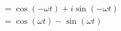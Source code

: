 \documentclass[preview]{standalone}
\begin{document}
\begin{align*}
=\cos{(-\omega t)}+i\sin{(-\omega t)} \\ = \cos{(\omega t)}-\sin{(\omega t)}
\end{align*}
\end{document}
